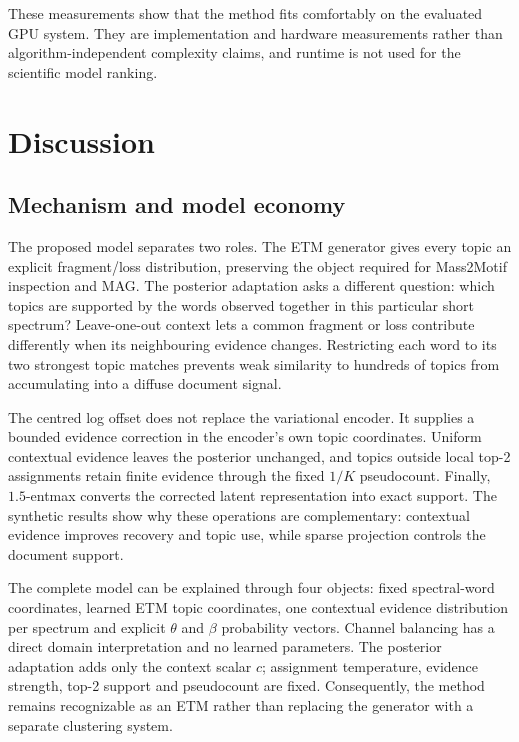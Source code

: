 \documentclass[10pt,a4paper]{article}
\begin{document}
These measurements show that the method fits comfortably on the evaluated GPU
system. They are implementation and hardware measurements rather than
algorithm-independent complexity claims, and runtime is not used for the
scientific model ranking.

\section{Discussion}

\subsection{Mechanism and model economy}

The proposed model separates two roles. The ETM generator gives every topic an
explicit fragment/loss distribution, preserving the object required for
Mass2Motif inspection and MAG. The posterior adaptation asks a different
question: which topics are supported by the words observed together in this
particular short spectrum? Leave-one-out context lets a common fragment or loss
contribute differently when its neighbouring evidence changes. Restricting each
word to its two strongest topic matches prevents weak similarity to hundreds of
topics from accumulating into a diffuse document signal.

The centred log offset does not replace the variational encoder. It supplies a
bounded evidence correction in the encoder's own topic coordinates. Uniform
contextual evidence leaves the posterior unchanged, and topics outside local
top-2 assignments
retain finite evidence through the fixed $1/K$ pseudocount. Finally,
$1.5$-entmax converts the corrected latent representation into exact support.
The synthetic results show why these operations are complementary: contextual
evidence improves recovery and topic use, while sparse projection controls the
document support.

The complete model can be explained through four objects: fixed spectral-word
coordinates, learned ETM topic coordinates, one contextual evidence
distribution per spectrum and explicit $\theta$ and $\beta$ probability
vectors. Channel balancing has a direct domain interpretation and no learned
parameters. The posterior adaptation adds only the context scalar $c$;
assignment temperature, evidence strength, top-2 support and pseudocount are
fixed.
Consequently, the method remains recognizable as an ETM rather than replacing
the generator with a separate clustering system.
\end{document}
